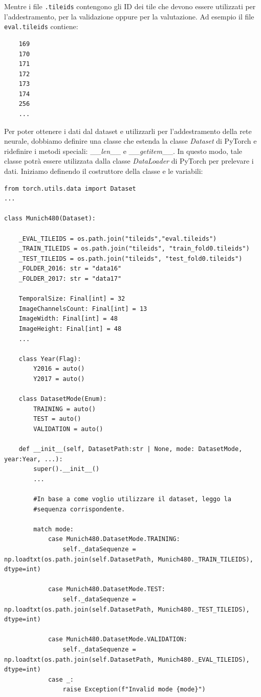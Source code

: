 Mentre i file \texttt{.tileids} contengono gli ID dei tile che devono essere utilizzati 
per l'addestramento, per la validazione oppure per la valutazione.
Ad esempio il file \texttt{eval.tileids} contiene:
\begin{verbatim}
    169
    170
    171
    172
    173
    174
    256
    ...
\end{verbatim}

Per poter ottenere i dati dal dataset e utilizzarli per l'addestramento 
della rete neurale, dobbiamo definire una classe che estenda 
la classe \textit{Dataset} di PyTorch e ridefinire i metodi 
speciali: \_\_\textit{len}\_\_ e \_\_\textit{getitem}\_\_.
In questo modo, tale classe potrà essere utilizzata dalla 
classe \textit{DataLoader} di PyTorch per prelevare i dati.
Iniziamo definendo il costruttore della classe e le variabili:
\begin{lstlisting}
from torch.utils.data import Dataset
...

class Munich480(Dataset):
    
    _EVAL_TILEIDS = os.path.join("tileids","eval.tileids")
    _TRAIN_TILEIDS = os.path.join("tileids", "train_fold0.tileids")
    _TEST_TILEIDS = os.path.join("tileids", "test_fold0.tileids")
    _FOLDER_2016: str = "data16"
    _FOLDER_2017: str = "data17"
    
    TemporalSize: Final[int] = 32
    ImageChannelsCount: Final[int] = 13
    ImageWidth: Final[int] = 48
    ImageHeight: Final[int] = 48
    ...

    class Year(Flag):
        Y2016 = auto()
        Y2017 = auto()

    class DatasetMode(Enum):
        TRAINING = auto()
        TEST = auto()
        VALIDATION = auto()

    def __init__(self, DatasetPath:str | None, mode: DatasetMode, year:Year, ...):
        super().__init__()
        ...

        #In base a come voglio utilizzare il dataset, leggo la 
        #sequenza corrispondente.

        match mode:
            case Munich480.DatasetMode.TRAINING:
                self._dataSequenze = np.loadtxt(os.path.join(self.DatasetPath, Munich480._TRAIN_TILEIDS), dtype=int)
                
            case Munich480.DatasetMode.TEST:
                self._dataSequenze = np.loadtxt(os.path.join(self.DatasetPath, Munich480._TEST_TILEIDS), dtype=int)
                
            case Munich480.DatasetMode.VALIDATION:
                self._dataSequenze = np.loadtxt(os.path.join(self.DatasetPath, Munich480._EVAL_TILEIDS), dtype=int)
            case _:
                raise Exception(f"Invalid mode {mode}") 
        

\end{lstlisting}
